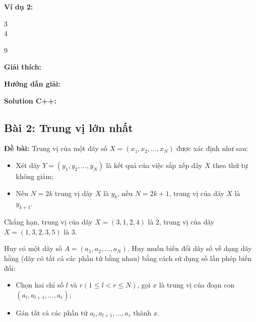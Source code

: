 \documentclass[12pt]{scrartcl}  %
\begin{document}
\textbf{Ví dụ 2:}
\begin{tcolorbox}[colback=gray!5!white, colframe=blue!50!black, title=Input]
3\\
4
\end{tcolorbox}
\begin{tcolorbox}[colback=gray!5!white, colframe=green!50!black, title=Output]
9
\end{tcolorbox}

\textbf{Giải thích:}
\begin{center}
\end{center}

\textbf{Hướng dẫn giải:}

\textbf{Solution C++:}

\subsection{Bài 2: Trung vị lớn nhất}
\textbf{Đề bài:}
Trung vị của một dãy số $X = (x_1, x_2, ..., x_N)$ được xác định như sau:
\begin{itemize}
    \item Xét dãy $Y = (y_1, y_2, ..., y_N)$ là kết quả của việc sắp xếp dãy $X$ theo thứ tự không giảm;
    \item Nếu $N = 2k$ trung vị dãy $X$ là $y_k$, nếu $N = 2k + 1$, trung vị của dãy $X$ là $y_{k+1}$.
\end{itemize}
Chẳng hạn, trung vị của dãy $X = (3, 1, 2, 4)$ là $2$, trung vị của dãy $X = (1, 3, 2, 3, 5)$ là $3$.

Huy có một dãy số $A = (a_1, a_2, ..., a_N)$. Huy muốn biến đổi dãy số về dạng dãy hằng (dãy có tất cả các phần tử bằng nhau) bằng cách sử dụng số lần phép biến đổi:
\begin{itemize}
    \item Chọn hai chỉ số $l$ và $r (1 \leq l < r \leq N)$, gọi $x$ là trung vị của đoạn con $(a_l, a_{l + 1}, ..., a_r)$;
    \item Gán tất cả các phần tử $a_l, a_{l + 1}, ..., a_r$ thành $x$.
\end{itemize}
\end{document}
